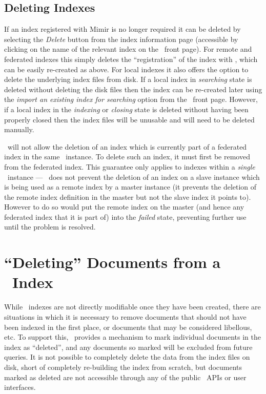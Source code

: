\subsection{Deleting Indexes}

If an index registered with Mimir is no longer required it can be deleted by
selecting the {\em Delete} button from the index information page (accessible
by clicking on the name of the relevant index on the \Mimir\ front page).  For
remote and federated indexes this simply deletes the ``registration'' of the
index with \Mimir, which can be easily re-created as above.  For local indexes
it also offers the option to delete the underlying index files from disk.  If a
local index in {\em searching} state is deleted without deleting the disk files
then the index can be re-created later using the {\em import an existing index
for searching} option from the \Mimir\ front page.  However, if a local index
in the {\em indexing} or {\em closing} state is deleted without having been
properly closed then the index files will be unusable and will need to be
deleted manually.

\Mimir\ will not allow the deletion of an index which is currently part of a
federated index in the same \Mimir\ instance.  To delete such an index, it must
first be removed from the federated index.  This guarantee only applies to
indexes within a {\em single} \Mimir\ instance --- \Mimir\ does not prevent the
deletion of an index on a slave instance which is being used as a remote index
by a master instance (it prevents the deletion of the remote index definition
in the master but not the slave index it points to).  However to do so would
put the remote index on the master (and hence any federated index that it is
part of) into the {\em failed} state, preventing further use until the problem
is resolved.

\section{``Deleting'' Documents from a \Mimir\ Index}\label{sec:admin:takedown}

While \Mimir\ indexes are not directly modifiable once they have been created,
there are situations in which it is necessary to remove documents that should
not have been indexed in the first place, or documents that may be considered
libellous, etc.  To support this, \Mimir\ provides a mechanism to mark
individual documents in the index as ``deleted'', and any documents so marked
will be excluded from future queries.  It is not possible to completely delete
the data from the index files on disk, short of completely re-building the
index from scratch, but documents marked as deleted are not accessible through
any of the public \Mimir\ APIs or user interfaces.

